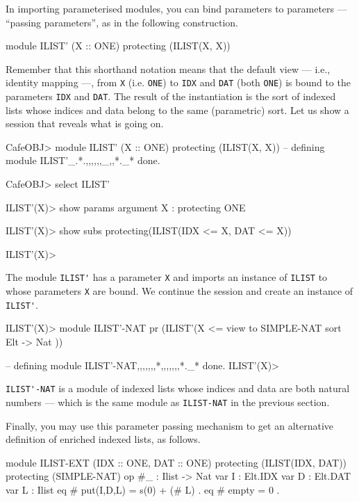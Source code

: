 \documentclass[a4paper]{memoir}
\begin{document}
In importing parameterised modules, you can bind parameters to
parameters --- ``passing parameters'', as in the following
construction.
\begin{vvtm}
\begin{ccode}
  module ILIST' (X :: ONE) {
    protecting (ILIST(X, X))
  }
\end{ccode}
\end{vvtm}
Remember that this shorthand notation means that the default view ---
i.e., identity mapping ---, from
\verb|X| (i.e. \verb|ONE|) to \verb|IDX| and \verb|DAT| (both \verb|ONE|)
is bound to the parameters \verb|IDX| and \verb|DAT|. The result of the
instantiation is the sort of indexed lists whose indices and data
belong to the same (parametric) sort. Let us show a session that reveals
what is going on.
\begin{vvtm}
\begin{ccode}
  CafeOBJ> module ILIST' (X :: ONE) {
    protecting (ILIST(X, X))
  }
  -- defining module ILIST'_.*.,,,,,,_,,*._* done.

  CafeOBJ> select ILIST'

  ILIST'(X)> show params
  argument X : protecting ONE

  ILIST'(X)> show subs
  protecting(ILIST(IDX <= X, DAT <= X))

  ILIST'(X)> 
\end{ccode}
\end{vvtm}
The module \verb|ILIST'| has a parameter \verb|X| and imports an
instance of \verb|ILIST| to whose parameters \verb|X| are bound.
We continue the session and create an instance of \verb|ILIST'|.
\begin{vvtm}
\begin{ccode}
  ILIST'(X)> module ILIST'-NAT {
    pr (ILIST'(X <= view to SIMPLE-NAT { sort Elt -> Nat }))
  }

  -- defining module ILIST'-NAT,,,,,,,*,,,,,,,*._* done.
  ILIST'(X)> 
\end{ccode}
\end{vvtm}
\verb|ILIST'-NAT| is a module of indexed lists whose indices and data
are both natural numbers --- which is the same module as
\verb|ILIST-NAT| in the previous section.

Finally, you may use this parameter passing mechanism to get
an alternative definition of enriched indexed lists, as follows.
\begin{vvtm}
\begin{ccode}
  module ILIST-EXT (IDX :: ONE, DAT :: ONE) {
    protecting (ILIST(IDX, DAT))
    protecting (SIMPLE-NAT)
    op #_ : Ilist -> Nat
    var I : Elt.IDX
    var D : Elt.DAT
    var L : Ilist
    eq # put(I,D,L) = s(0) + (# L) .
    eq # empty = 0 .
  }
\end{ccode}
\end{vvtm}
\end{document}

